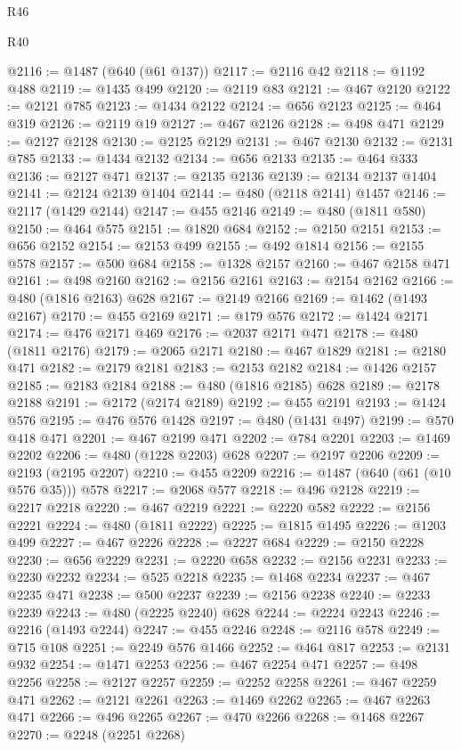 \begin{lexlean}{R46}
\begin{lexlean}{R40}
\begin{coremodule}
{{{{{{{{{{{{{{{{{{{{{{{{{{{{{{{{{{{{{{{{{{{{{{{{{{{{{{{{{{{{{{{{{{{{{{{{{{{{{{{{{{{{{{{{{{{{{{{{{{{{{{{{{{{{{@2116 := @1487 (@640 (@61 @137))
@2117 := @2116 @42
@2118 := @1192 @488
@2119 := @1435 @499
@2120 := @2119 @83
@2121 := @467 @2120
@2122 := @2121 @785
@2123 := @1434 @2122
@2124 := @656 @2123
@2125 := @464 @319
@2126 := @2119 @19
@2127 := @467 @2126
@2128 := @498 @471
@2129 := @2127 @2128
@2130 := @2125 @2129
@2131 := @467 @2130
@2132 := @2131 @785
@2133 := @1434 @2132
@2134 := @656 @2133
@2135 := @464 @333
@2136 := @2127 @471
@2137 := @2135 @2136
@2139 := @2134 @2137 @1404
@2141 := @2124 @2139 @1404
@2144 := @480 (@2118 @2141) @1457
@2146 := @2117 (@1429 @2144)
@2147 := @455 @2146
@2149 := @480 (@1811 @580)
@2150 := @464 @575
@2151 := @1820 @684
@2152 := @2150 @2151
@2153 := @656 @2152
@2154 := @2153 @499
@2155 := @492 @1814
@2156 := @2155 @578
@2157 := @500 @684
@2158 := @1328 @2157
@2160 := @467 @2158 @471
@2161 := @498 @2160
@2162 := @2156 @2161
@2163 := @2154 @2162
@2166 := @480 (@1816 @2163) @628
@2167 := @2149 @2166
@2169 := @1462 (@1493 @2167)
@2170 := @455 @2169
@2171 := @179 @576
@2172 := @1424 @2171
@2174 := @476 @2171 @469
@2176 := @2037 @2171 @471
@2178 := @480 (@1811 @2176)
@2179 := @2065 @2171
@2180 := @467 @1829
@2181 := @2180 @471
@2182 := @2179 @2181
@2183 := @2153 @2182
@2184 := @1426 @2157
@2185 := @2183 @2184
@2188 := @480 (@1816 @2185) @628
@2189 := @2178 @2188
@2191 := @2172 (@2174 @2189)
@2192 := @455 @2191
@2193 := @1424 @576
@2195 := @476 @576 @1428
@2197 := @480 (@1431 @497)
@2199 := @570 @418 @471
@2201 := @467 @2199 @471
@2202 := @784 @2201
@2203 := @1469 @2202
@2206 := @480 (@1228 @2203) @628
@2207 := @2197 @2206
@2209 := @2193 (@2195 @2207)
@2210 := @455 @2209
@2216 := @1487 (@640 (@61 (@10 @576 @35))) @578
@2217 := @2068 @577
@2218 := @496 @2128
@2219 := @2217 @2218
@2220 := @467 @2219
@2221 := @2220 @582
@2222 := @2156 @2221
@2224 := @480 (@1811 @2222)
@2225 := @1815 @1495
@2226 := @1203 @499
@2227 := @467 @2226
@2228 := @2227 @684
@2229 := @2150 @2228
@2230 := @656 @2229
@2231 := @2220 @658
@2232 := @2156 @2231
@2233 := @2230 @2232
@2234 := @525 @2218
@2235 := @1468 @2234
@2237 := @467 @2235 @471
@2238 := @500 @2237
@2239 := @2156 @2238
@2240 := @2233 @2239
@2243 := @480 (@2225 @2240) @628
@2244 := @2224 @2243
@2246 := @2216 (@1493 @2244)
@2247 := @455 @2246
@2248 := @2116 @578
@2249 := @715 @108
@2251 := @2249 @576 @1466
@2252 := @464 @817
@2253 := @2131 @932
@2254 := @1471 @2253
@2256 := @467 @2254 @471
@2257 := @498 @2256
@2258 := @2127 @2257
@2259 := @2252 @2258
@2261 := @467 @2259 @471
@2262 := @2121 @2261
@2263 := @1469 @2262
@2265 := @467 @2263 @471
@2266 := @496 @2265
@2267 := @470 @2266
@2268 := @1468 @2267
@2270 := @2248 (@2251 @2268)
}}}}}}}}}}}}}}}}}}}}}}}}}}}}}}}}}}}}}}}}}}}}}}}}}}}}}}}}}}}}}}}}}}}}}}}}}}}}}}}}}}}}}}}}}}}}}}}}}}}}}}}}}}}}}
\end{coremodule}
\end{lexlean}
\end{lexlean}
